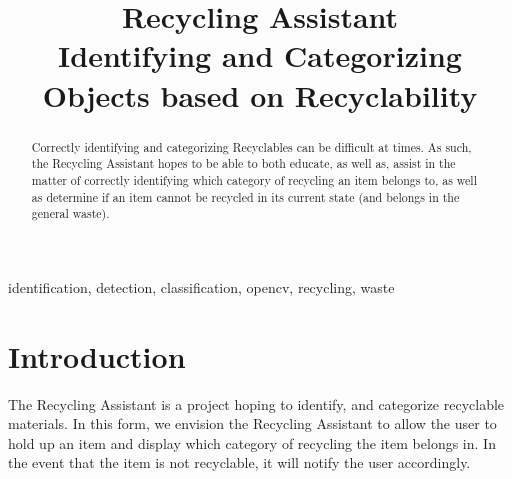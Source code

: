 \documentclass[conference]{IEEEtran}
\begin{document}
\title{Recycling Assistant\\
{\footnotesize \textsuperscript{}Identifying and Categorizing Objects based on Recyclability}
}

\author{
\and
{}
\and
{}
}

\maketitle

\begin{abstract}
Correctly identifying and categorizing Recyclables can be difficult at times. As such, the Recycling Assistant hopes to be able to both educate, as well as, assist in the matter of correctly identifying which category of recycling an item belongs to, as well as determine if an item cannot be recycled in its current state (and belongs in the general waste).
\end{abstract}

\begin{IEEEkeywords}
identification, detection, classification, opencv, recycling, waste
\end{IEEEkeywords}

\section{Introduction}
The Recycling Assistant is a project hoping to identify, and categorize recyclable materials. In this form, we envision the Recycling Assistant to allow the user to hold up an item and display which category of recycling the item belongs in. In the event that the item is not recyclable, it will notify the user accordingly. 
\end{document}
